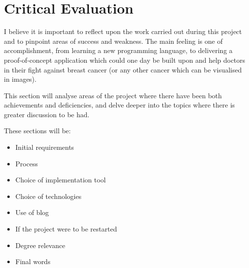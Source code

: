 \chapter{Critical Evaluation}





I believe it is important to reflect upon the work carried out during this project and to pinpoint areas of success and weakness. The main feeling is one of accomplishment, from learning a new programming language, to delivering a proof-of-concept application which could one day be built upon and help doctors in their fight against breast cancer (or any other cancer which can be visualised in images).

This section will analyse areas of the project where there have been both achievements and deficiencies, and delve deeper into the topics where there is greater discussion to be had.

These sections will be:
\begin{itemize}
  \item Initial requirements
  \item Process
  \item Choice of implementation tool
  \item Choice of technologies
  \item Use of blog
  \item If the project were to be restarted
  \item Degree relevance
  \item Final words
\end{itemize}

